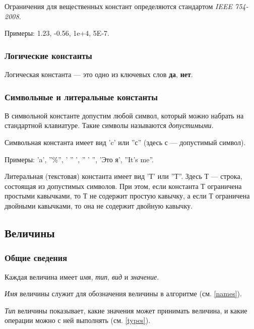 Ограничения для вещественных констант определяются стандартом \emph{IEEE 754-2008}.

Примеры: \textsf{1.23, -0.56, 1e+4, 5E-7}.

\subsubsection{Логические константы}

	Логическая константа --- это одно из ключевых слов \textbf{да}, \textbf{нет}.

\subsubsection{Символьные и литеральные константы}

	В символьной константе допустим любой символ, который можно набрать на стандартной клавиатуре. Такие символы называются \emph{допустимыми}.

	Символьная константа имеет вид \textsf{'c'} или \textsf{''с''} (здесь \textsf{с} --- допустимый символ).

	Примеры: \textsf{'a'}, \textsf{''\%''}, \textsf{' '' '}, \textsf{'' ' ''}, \textsf{'Это я'}, \textsf{''It's me''}.
 
	Литеральная (текстовая) константа имеет вид \textsf{'Т'} или \textsf{''Т''}. Здесь \textsf{Т} --- строка,	состоящая из допустимых символов. При этом, если константа \textsf{Т} ограничена простыми кавычками, то \textsf{Т} не содержит простую кавычку, а если \textsf{Т} ограничена двойными кавычками, то она не содержит двойную кавычку.

\subsection{Величины}

\subsubsection{Общие сведения}
\label{velocities}

	Каждая величина имеет \emph{имя}, \emph{тип}, \emph{вид} и \emph{значение}.

	\emph{Имя} величины служит для обозначения величины в алгоритме (см. \ref{names}).

	\emph{Тип} величины показывает, какие значения может принимать величина, и какие операции можно с ней выполнять (см. \ref{types}).

